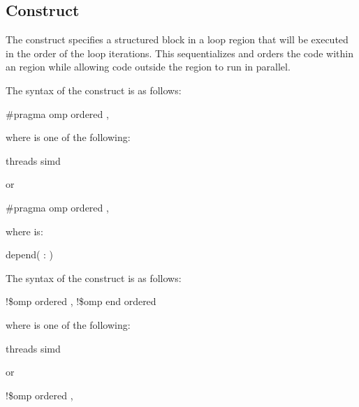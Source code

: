 \subsection{ Construct}
\label{subsec:ordered Construct}
\summary
The  construct specifies a structured block in a loop region that will be 
executed in the order of the loop iterations. This sequentializes and orders the code 
within an  region while allowing code outside the region to run in parallel. 

\begin{samepage}
\syntax
\ccppspecificstart
The syntax of the  construct is as follows:

\begin{boxedcode}
\#pragma omp ordered \plc{[clause[ [},\plc{] clause] ... ]} 
\end{boxedcode}

where  is one of the following:
\begin{indentedcodelist}
threads
simd
\end{indentedcodelist}

or

\begin{boxedcode}
\#pragma omp ordered \plc{clause [[[},\plc{] clause] ... ]} 
\end{boxedcode}
where  is:
\begin{indentedcodelist}
depend( \plc{[}: \plc{vec]})
\end{indentedcodelist}


\ccppspecificend
\end{samepage}

\fortranspecificstart
The syntax of the  construct is as follows:

\begin{boxedcode}
!\$omp ordered \plc{[clause[ [},\plc{] clause] ... ]}
!\$omp end ordered
\end{boxedcode}

where  is one of the following:
\begin{indentedcodelist}
threads
simd
\end{indentedcodelist}

or

\begin{boxedcode}
!\$omp ordered \plc{clause [[[},\plc{] clause] ... ]}
\end{boxedcode}


